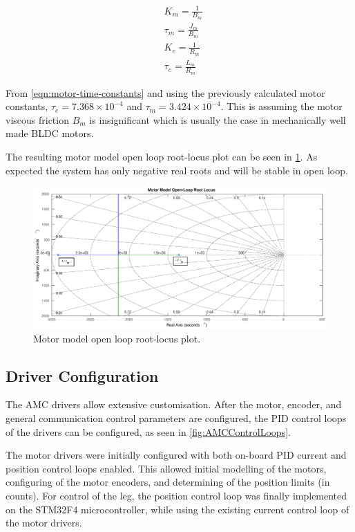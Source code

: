 \begin{equation} \label{eqn:motor-time-constants}
\begin{aligned}
&K_m = \frac{1}{B_m} \\
&\tau_m = \frac{J_m}{B_m} \\
&K_e = \frac{1}{R_m} \\
&\tau_e = \frac{L_m}{R_m} 
\end{aligned}
\end{equation}

From \cref{eqn:motor-time-constants} and using the previously calculated motor constants, $\tau_e = 7.368 \times 10^{-4}$ and $\tau_m = 3.424 \times 10^{-4}$. This is assuming the motor viscous friction $B_m$ is insignificant which is usually the case in mechanically well made BLDC motors.

The resulting motor model open loop root-locus plot can be seen in \cref{fig:ol-motor-rlocus}. As expected the system has only negative real roots and will be stable in open loop.

\begin{figure}
\centering
\includegraphics[width=1\textwidth]{images/motor/ol-motor-rlocus} 
\caption{Motor model open loop root-locus plot.}
\label{fig:ol-motor-rlocus}
\end{figure}


\subsection{Driver Configuration}

The AMC drivers allow extensive customisation. After the motor, encoder, and general communication control parameters are configured, the PID control loops of the drivers can be configured, as seen in \cref{fig:AMCControlLoops}.

The motor drivers were initially configured with both on-board PID current and position control loops enabled. This allowed initial modelling of the motors, configuring of the motor encoders, and determining of the position limits (in counts). For control of the leg, the position control loop was finally implemented on the STM32F4 microcontroller, while using the existing current control loop of the motor drivers.

